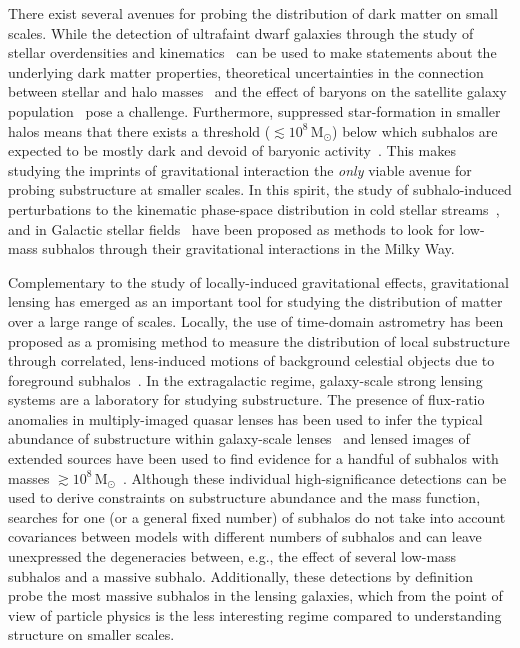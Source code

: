 \documentclass[twocolumn]{aastex62}
\begin{document}
There exist several avenues for probing the distribution of dark matter on small scales. While the detection of ultrafaint dwarf galaxies through the study of stellar overdensities and kinematics~\citep{1503.02584,0706.2687,1503.02079} can be used to make statements about the underlying dark matter properties, theoretical uncertainties in the connection between stellar and halo masses~\citep{1809.05542,1804.03097} and the effect of baryons on the satellite galaxy population~\citep{1812.00044,1811.11791,1701.03792,1608.01849} pose a challenge. Furthermore, suppressed star-formation in smaller halos means that there exists a threshold ($\lesssim 10^8\,\mathrm{M}_\odot$) below which subhalos are expected to be mostly dark and devoid of baryonic activity~\citep{1992MNRAS.256P..43E,1611.02281,1607.03127}. This makes studying the imprints of gravitational interaction the \emph{only} viable avenue for probing substructure at smaller scales. In this spirit, the study of subhalo-induced perturbations to the kinematic phase-space distribution in cold stellar streams~\citep{1804.06854,astro-ph/9807243,1109.6022,1303.4342,1811.03631}, and in Galactic stellar fields~\citep{1711.03554} have been proposed as methods to look for low-mass subhalos through their gravitational interactions in the Milky Way.

Complementary to the study of locally-induced gravitational effects, gravitational lensing has emerged as an important tool for studying the distribution of matter over a large range of scales. Locally, the use of time-domain astrometry has been proposed as a promising method to measure the distribution of local substructure through correlated, lens-induced motions of background celestial objects due to foreground subhalos~\citep{2018JCAP...07..041V}. In the extragalactic regime, galaxy-scale strong lensing systems are a laboratory for studying substructure. The presence of flux-ratio anomalies in multiply-imaged quasar lenses has been used to infer the typical abundance of substructure within galaxy-scale lenses~\citep{2002ApJ...572...25D,2019arXiv190504182H,2002ApJ...572...25D} and lensed images of extended sources have been used to find evidence for a handful of subhalos with masses $\gtrsim 10^8\,\mathrm{M}_\odot$~\citep{1601.01388,0910.0760,1201.3643}. Although these individual high-significance detections can be used to derive constraints on substructure abundance and the mass function, searches for one (or a general fixed number) of subhalos do not take into account covariances between models with different numbers of subhalos and can leave unexpressed the degeneracies between, e.g., the effect of several low-mass subhalos and a massive subhalo. Additionally, these detections by definition probe the most massive subhalos in the lensing galaxies, which from the point of view of particle physics is the less interesting regime compared to understanding structure on smaller scales.
\end{document}
